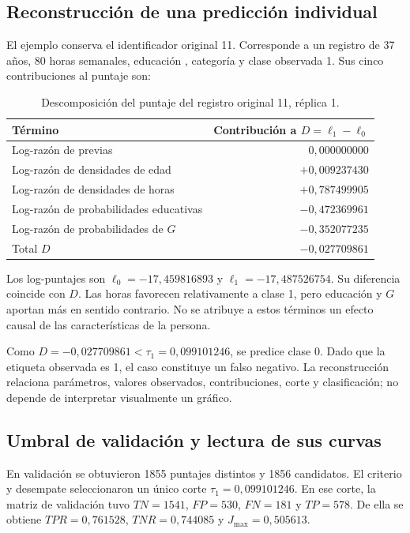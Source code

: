 \documentclass[11pt,a4paper]{article}
\newcommand{\archivo}[1]{\path{#1}}
\begin{document}
\subsection{Reconstrucción de una predicción individual}
El ejemplo conserva el identificador original 11. Corresponde a un registro de 37 años, 80 horas semanales, educación \archivo{Some-college}, categoría \archivo{Male/Black} y clase observada 1. Sus cinco contribuciones al puntaje son:
\begin{table}[H]\centering\small
\caption{Descomposición del puntaje del registro original 11, réplica 1.}\label{tab:persona}
\begin{tabular}{lr}\toprule
Término & Contribución a $D=\ell_1-\ell_0$\\\midrule
Log-razón de previas & $0,000000000$\\
Log-razón de densidades de edad & $+0,009237430$\\
Log-razón de densidades de horas & $+0,787499905$\\
Log-razón de probabilidades educativas & $-0,472369961$\\
Log-razón de probabilidades de $G$ & $-0,352077235$\\\midrule
Total $D$ & $-0,027709861$\\\bottomrule
\end{tabular}\end{table}

Los log-puntajes son $\ell_0=-17,459816893$ y $\ell_1=-17,487526754$. Su diferencia coincide con $D$. Las horas favorecen relativamente a clase 1, pero educación y $G$ aportan más en sentido contrario. No se atribuye a estos términos un efecto causal de las características de la persona.

Como $D=-0,027709861<\tau_1=0,099101246$, se predice clase 0. Dado que la etiqueta observada es 1, el caso constituye un falso negativo. La reconstrucción relaciona parámetros, valores observados, contribuciones, corte y clasificación; no depende de interpretar visualmente un gráfico.

\subsection{Umbral de validación y lectura de sus curvas}
En validación se obtuvieron 1855 puntajes distintos y 1856 candidatos. El criterio y desempate seleccionaron un único corte $\tau_1=0,099101246$. En ese corte, la matriz de validación tuvo $TN=1541$, $FP=530$, $FN=181$ y $TP=578$. De ella se obtiene $TPR=0,761528$, $TNR=0,744085$ y $J_{\max}=0,505613$.
\end{document}
